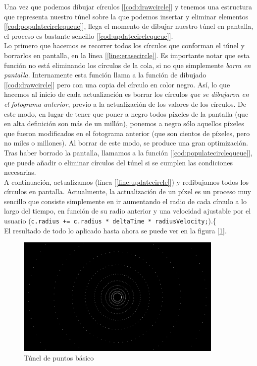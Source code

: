 Una vez que podemos dibujar círculos [\ref{cod:drawcircle}] y tenemos una estructura que representa nuestro túnel sobre la que podemos insertar y eliminar elementos [\ref{cod:populatecirclequeue}], llega el momento de dibujar nuestro túnel en pantalla, el proceso es bastante sencillo [\ref{cod:updatecirclequeue}].\\

Lo primero que hacemos es recorrer todos los círculos que conforman el túnel y borrarlos en pantalla, en la línea [\ref{line:erasecircle}]. Es importante notar que esta función no está eliminando los círculos de la cola, si no que simplemente \emph{borra en pantalla}. Internamente esta función llama a la función de dibujado [\ref{cod:drawcircle}] pero con una copia del círculo en color negro. Así, lo que hacemos al inicio de cada actualización es borrar los círculos \emph{que se dibujaron en el fotograma anterior}, previo a la actualización de los valores de los círculos. De este modo, en lugar de tener que poner a negro todos píxeles de la pantalla (que en alta definición son más de un millón), ponemos a negro sólo aquellos píxeles que fueron modificados en el fotograma anterior (que son cientos de píxeles, pero no miles o millones). Al borrar de este modo, se produce una gran optimización.\\

Tras haber borrado la pantalla, llamamos a la función [\ref{cod:populatecirclequeue}], que puede añadir o eliminar círculos del túnel si se cumplen las condiciones necesarias.\\

A continuación, actualizamos (línea [\ref{line:updatecircle}]) y redibujamos todos los círculos en pantalla. Actualmente, la actualización de un píxel es un proceso muy sencillo que consiste simplemente en ir aumentando el radio de cada círculo a lo largo del tiempo, en función de su radio anterior y una velocidad ajustable por el usuario (\lstinline{c.radius += c.radius * deltaTime * radiusVelocity;}).\{\\

El resultado de todo lo aplicado hasta ahora se puede ver en la figura [\ref{fig:basicdottunnel}].\\

\begin{figure}[h]
	\centering
	\includegraphics[width=10cm]{archivos/basicdottunnel}
	\caption{Túnel de puntos básico}
	\label{fig:basicdottunnel}
\end{figure}

